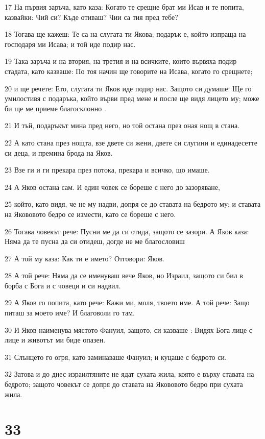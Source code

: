 \par 17 На първия заръча, като каза: Когато те срещне брат ми Исав и те попита, казвайки: Чий си? Къде отиваш? Чии са тия пред тебе?
\par 18 Тогава ще кажеш: Те са на слугата ти Якова; подарък е, който изпраща на господаря ми Исава; и той иде подир нас.
\par 19 Така заръча и на втория, на третия и на всичките, които вървяха подир стадата, като казваше: По тоя начин ще говорите на Исава, когато го срещнете;
\par 20 и ще речете: Ето, слугата ти Яков иде подир нас. Защото си думаше: Ще го умилостивя с подаръка, който върви пред мене и после ще видя лицето му; може би ще ме приеме благосклонно .
\par 21 И тъй, подаръкът мина пред него, но той остана през оная нощ в стана.
\par 22 А като стана през нощта, взе двете си жени, двете си слугини и единадесетте си деца, и премина брода на Яков.
\par 23 Взе ги и ги прекара през потока, прекара и всичко, що имаше.
\par 24 А Яков остана сам. И един човек се бореше с него до зазоряване,
\par 25 който, като видя, че не му надви, допря се до ставата на бедрото му; и ставата на Якововото бедро се измести, като се бореше с него.
\par 26 Тогава човекът рече: Пусни ме да си отида, защото се зазори. А Яков каза: Няма да те пусна да си отидеш, догде не ме благословиш
\par 27 А той му каза: Как ти е името? Отговори: Яков.
\par 28 А той рече: Няма да се именуваш вече Яков, но Израил, защото си бил в борба с Бога и с човеци и си надвил.
\par 29 А Яков го попита, като рече: Кажи ми, моля, твоето име. А той рече: Защо питаш за моето име? И благоволи го там.
\par 30 И Яков наименува мястото Фануил, защото, си казваше : Видях Бога лице с лице и животът ми биде опазен.
\par 31 Слънцето го огря, като заминаваше Фануил; и куцаше с бедрото си.
\par 32 Затова и до днес израилтяните не ядат сухата жила, която е върху ставата на бедрото; защото човекът се допря до ставата на Якововото бедро при сухата жила.

\chapter{33}


